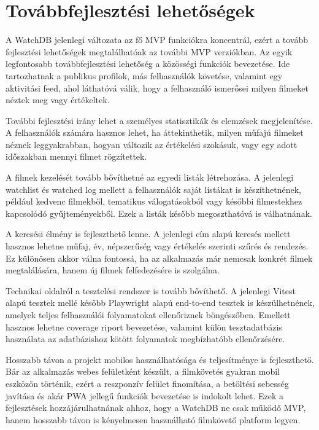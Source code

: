 \section{Továbbfejlesztési lehetőségek}

A WatchDB jelenlegi változata az fő MVP funkciókra koncentrál, ezért a tovább fejlesztési lehetőségek megtalálhatóak az további MVP verziókban. Az egyik legfontosabb továbbfejlesztési lehetőség a közösségi funkciók bevezetése. Ide tartozhatnak a publikus profilok, más felhasználók követése, valamint egy aktivitási feed, ahol láthatóvá válik, hogy a felhasználó ismerősei milyen filmeket néztek meg vagy értékeltek.

További fejlesztési irány lehet a személyes statisztikák és elemzések megjelenítése. A felhasználók számára hasznos lehet, ha áttekinthetik, milyen műfajú filmeket néznek leggyakrabban, hogyan változik az értékelési szokásuk, vagy egy adott időszakban mennyi filmet rögzítettek.

A filmek kezelését tovább bővíthetné az egyedi listák létrehozása. A jelenlegi watchlist és watched log mellett a felhasználók saját listákat is készíthetnének, például kedvenc filmekből, tematikus válogatásokból vagy későbbi filmestekhez kapcsolódó gyűjteményekből. Ezek a listák később megoszthatóvá is válhatnának.

A keresési élmény is fejleszthető lenne. A jelenlegi cím alapú keresés mellett hasznos lehetne műfaj, év, népszerűség vagy értékelés szerinti szűrés és rendezés. Ez különösen akkor válna fontossá, ha az alkalmazás már nemcsak konkrét filmek megtalálására, hanem új filmek felfedezésére is szolgálna.

Technikai oldalról a tesztelési rendszer is tovább bővíthető. A jelenlegi Vitest alapú tesztek mellé később Playwright alapú end-to-end tesztek is készülhetnének, amelyek teljes felhasználói folyamatokat ellenőriznek böngészőben. Emellett hasznos lehetne coverage riport bevezetése, valamint külön tesztadatbázis használata az adatbázishoz kötött folyamatok megbízhatóbb ellenőrzésére.

Hosszabb távon a projekt mobilos használhatósága és teljesítménye is fejleszthető. Bár az alkalmazás webes felületként készült, a filmkövetés gyakran mobil eszközön történik, ezért a reszponzív felület finomítása, a betöltési sebesség javítása és akár PWA jellegű funkciók bevezetése is indokolt lehet. Ezek a fejlesztések hozzájárulhatnának ahhoz, hogy a WatchDB ne csak működő MVP, hanem hosszabb távon is kényelmesen használható filmkövető platform legyen.
